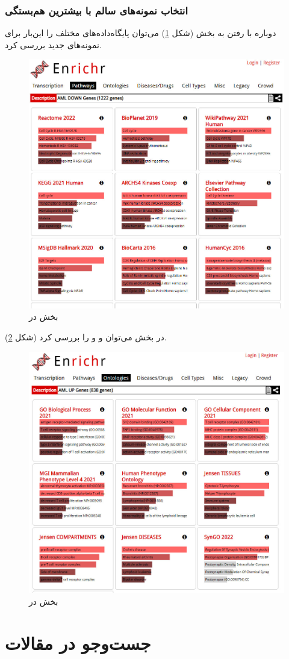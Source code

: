 \documentclass{article}
\begin{document}
\subsubsection{انتخاب نمونه‌های سالم با بیشترین هم‌بستگی}
دوباره با رفتن به بخش  (شکل \ref{fig:enrichr-pathways-d-2}) می‌توان پایگاه‌داده‌های  مختلف را این‌بار برای نمونه‌های جدید بررسی کرد.
\begin{figure}[h!]
	\centering
	\includegraphics[width=0.5\columnwidth]{figs/enrichr-pathways-d-2.jpg}
	\caption{بخش  در }
	\label{fig:enrichr-pathways-d-2}
\end{figure}

در بخش  می‌توان  و  و  را بررسی کرد (شکل \ref{fig:enrichr-ontology-d-2}).
\begin{figure}[h!]
	\centering
	\includegraphics[width=0.5\columnwidth]{figs/enrichr-ontologies-2.jpg}
	\caption{بخش  در }
	\label{fig:enrichr-ontology-d-2}
\end{figure}

\section{جست‌و‌جو در مقالات}
\end{document}
